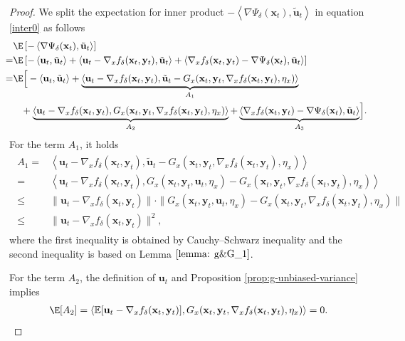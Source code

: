 \documentclass[11pt]{article}
\def\vu{\mathbf{u}}
\def\vx{\mathbf{x}}
\def\vy{\mathbf{y}}
\begin{document}
\begin{proof}
We split the expectation for inner product $-\left\langle \nabla \Psi_{\delta}(  \vx_t), \tilde{\vu}_t \right\rangle$ in equation \eqref{inter0} as follows
\begin{align}\label{inter0}
\begin{split}
\!\!\!& \E\left[-\left\langle \nabla \Psi_{\delta}(  \vx_t), \tilde{\vu}_t \right\rangle \right]\\
\!\!\!=& \E\left[ -  \left\langle \vu_t,\tilde{\vu}_t \right\rangle
 +\left\langle \vu_t-\nabla_x f_\delta(\vx_t,\vy_t), \tilde{\vu}_t \right\rangle  
+  \left\langle \nabla_x f_\delta(\vx_t,\vy_t)-\nabla\Psi_\delta(\vx_t), \tilde{\vu}_t \right\rangle
\right]\\
\!\!\!=&
\E\Big[ - \left\langle \vu_t,\tilde{\vu}_t \right\rangle
 + \underbrace{\left\langle \vu_t-\nabla_x f_\delta(\vx_t,\vy_t), \tilde{\vu}_t -G_x(\vx_t,\vy_t,\nabla_x f_\delta(\vx_t,\vy_t),\eta_x)\right\rangle}_{A_1}  \\
\!\!\!&\quad\! +  \underbrace{\left\langle \vu_t-\nabla_x f_\delta(\vx_t,\vy_t), G_x(\vx_t,\vy_t,\nabla_x f_\delta(\vx_t,\vy_t),\eta_x) \right\rangle}_{A_2} 
 + \underbrace{\left\langle \nabla_x f_\delta(\vx_t,\vy_t)-\nabla\Psi_\delta(\vx_t), \tilde{\vu}_t \right\rangle}_{A_3}\!\Big].
\end{split}
\end{align}
For the term $A_1$, it holds
\begin{align}\label{ineq: A_1}
\begin{split}
    A_1
=& \left\langle \vu_t-\nabla_x f_\delta(\vx_t,\vy_t), \tilde{\vu}_t -G_x(\vx_t,\vy_t,\nabla_x f_\delta(\vx_t,\vy_t),\eta_x)
\right\rangle\\
=&\left\langle \vu_t-\nabla_x f_\delta(\vx_t,\vy_t), G_x(\vx_t,\vy_t,{\vu}_t,\eta_x) -G_x(\vx_t,\vy_t,\nabla_x f_\delta(\vx_t,\vy_t),\eta_x)
\right\rangle \\
\leq & \|\vu_t-\nabla_x f_\delta(\vx_t,\vy_t)\|\cdot
\|G_x(\vx_t,\vy_t,{\vu}_t,\eta_x) -G_x(\vx_t,\vy_t,\nabla_x f_\delta(\vx_t,\vy_t),\eta_x)\|\\
\le & \|\vu_t-\nabla_x f_\delta(\vx_t,\vy_t)\|^2,
\end{split}
\end{align}
where the first inequality is obtained by Cauchy--Schwarz inequality and the second inequality is based on Lemma $\ref{lemma: g&G_1}$.

For the term $A_2$, the definition of $\vu_t$ and Proposition \ref{prop:g-unbiased-variance} implies
\begin{align}\label{eq: A_2}
    \E[A_2]=\langle\mathbb{E}[\vu_t-\nabla_x f_\delta(\vx_t,\vy_t)],G_x(\vx_t,\vy_t,\nabla_x f_\delta(\vx_t,\vy_t),\eta_x)\rangle =0.
\end{align}



\end{proof}
\end{document}

